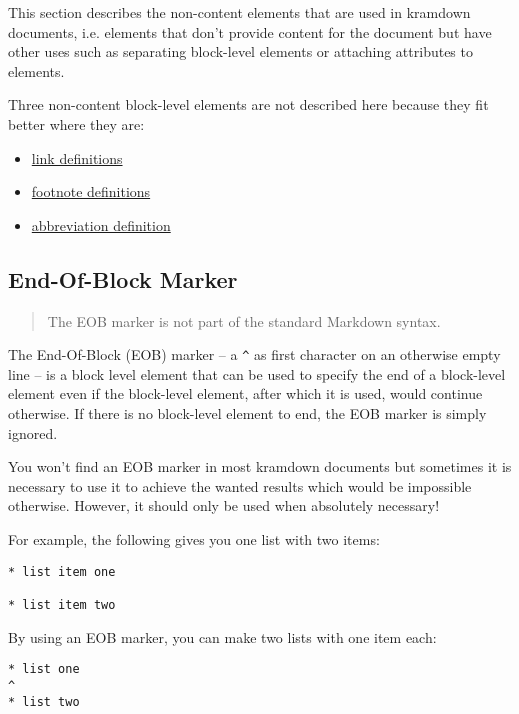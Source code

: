 \documentclass[a4paper]{article}
\begin{document}
This section describes the non-content elements that are used in
kramdown documents, i.e. elements that don't provide content for the
document but have other uses such as separating block-level elements or
attaching attributes to elements.

Three non-content block-level elements are not described here because
they fit better where they are:

\begin{itemize}
\item
  \protect\hyperlink{link-definitions}{link definitions}
\item
  \protect\hyperlink{footnotes}{footnote definitions}
\item
  \protect\hyperlink{abbreviations}{abbreviation definition}
\end{itemize}

\hypertarget{eob-marker}{\subsection{End-Of-Block
Marker}\label{eob-marker}}

\begin{quote}
The EOB marker is not part of the standard Markdown syntax.
\end{quote}

The End-Of-Block (EOB) marker -- a \texttt{\^{}} as first character on
an otherwise empty line -- is a block level element that can be used to
specify the end of a block-level element even if the block-level
element, after which it is used, would continue otherwise. If there is
no block-level element to end, the EOB marker is simply ignored.

You won't find an EOB marker in most kramdown documents but sometimes it
is necessary to use it to achieve the wanted results which would be
impossible otherwise. However, it should only be used when absolutely
necessary!

For example, the following gives you one list with two items:

\begin{verbatim}
* list item one

* list item two
\end{verbatim}

By using an EOB marker, you can make two lists with one item each:

\begin{verbatim}
* list one
^
* list two
\end{verbatim}
\end{document}

